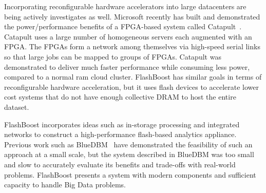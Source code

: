 Incorporating reconfigurable hardware accelerators into large datacenters are
being actively investigates as well. Microsoft recently has built and
demonstrated the power/performance benefits of a FPGA-based system called
Catapult~\cite{msr_catapult}.  Catapult uses a large number of homogeneous
servers each augmented with an FPGA.  The FPGAs form a network among themselves
via high-speed serial links so that large jobs can be mapped to groups of FPGAs.
Catapult was demonstrated to deliver much faster performance while consuming
less power, compared to a normal ram cloud cluster. FlashBoost has similar
goals in terms of reconfigurable hardware acceleration, but it uses flash
devices to accelerate lower cost systems that do not have enough collective DRAM
to host the entire dataset.

FlashBoost incorporates ideas such as in-storage processing and integrated
networks to construct a high-performance flash-based analytics appliance.
Previous work such as BlueDBM~\cite{bluedbm} have demonstrated the feasibility
of such an approach at a small scale, but the system described in BlueDBM was
too small and slow to accurately evaluate its benefits and trade-offs with
real-world problems.  FlashBoost presents a system with modern components and
sufficient capacity to handle Big Data problems.
